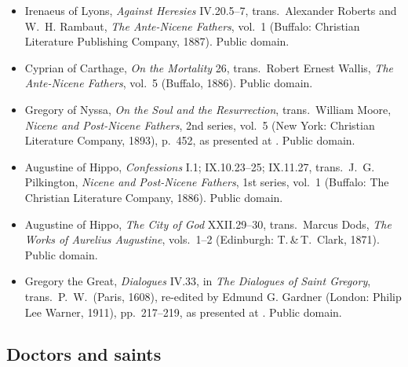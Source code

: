 {\fontsize{8.6}{9.6}\selectfont
\begin{itemize}[itemsep=0pt,parsep=0pt,topsep=0.05em]
\item Irenaeus of Lyons, \emph{Against Heresies} IV.20.5--7, trans.\ Alexander Roberts and W.~H. Rambaut, \emph{The Ante-Nicene Fathers}, vol.~1 (Buffalo: Christian Literature Publishing Company, 1887). Public domain.
\item Cyprian of Carthage, \emph{On the Mortality} 26, trans.\ Robert Ernest Wallis, \emph{The Ante-Nicene Fathers}, vol.~5 (Buffalo, 1886). Public domain.
\item Gregory of Nyssa, \emph{On the Soul and the Resurrection}, trans.\ William Moore, \emph{Nicene and Post-Nicene Fathers}, 2nd series, vol.~5 (New York: Christian Literature Company, 1893), p.~452, as presented at . Public domain.
\item Augustine of Hippo, \emph{Confessions} I.1; IX.10.23--25; IX.11.27, trans.\ J.~G. Pilkington, \emph{Nicene and Post-Nicene Fathers}, 1st series, vol.~1 (Buffalo: The Christian Literature Company, 1886). Public domain.
\item Augustine of Hippo, \emph{The City of God} XXII.29--30, trans.\ Marcus Dods, \emph{The Works of Aurelius Augustine}, vols.~1--2 (Edinburgh: T.\,\&\,T.~Clark, 1871). Public domain.
\item Gregory the Great, \emph{Dialogues} IV.33, in \emph{The Dialogues of Saint Gregory}, trans.\ P.~W.\ (Paris, 1608), re-edited by Edmund G. Gardner (London: Philip Lee Warner, 1911), pp.~217--219, as presented at . Public domain.
\end{itemize}}

\subsection*{Doctors and saints}

